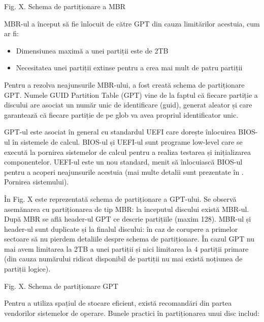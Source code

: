 Fig. X. Schema de partiționare a MBR

MBR-ul a început să fie înlocuit de către GPT din cauza limitărilor acestuia,
cum ar fi:

\begin{itemize}
	\item Dimensiunea maximă a unei partiții este de 2TB
	\item Necesitatea unei partiții extinse pentru a crea mai mult de patru partiții
\end{itemize}

Pentru a rezolva neajunsurile MBR-ului, a fost creată schema de partiționare
GPT. Numele GUID Partition Table (GPT) vine de la faptul că fiecare partiție a
discului are asociat un număr unic de identificare (guid), generat aleator și
care garantează că fiecare partiție de pe glob va avea propriul identificator
unic.

GPT-ul este asociat în general cu standardul UEFI care dorește înlocuirea
BIOS-ul în sistemele de calcul. BIOS-ul și UEFI-ul sunt programe low-level care
se execută la pornirea sistemelor de calcul pentru a realiza testarea și
inițializarea componentelor. UEFI-ul este un nou standard, menit să înlocuiască
BIOS-ul pentru a acoperi neajunsurile acestuia (mai multe detalii sunt
prezentate în . Pornirea sistemului).

În Fig. X este reprezentată schema de partiționare a GPT-ului. Se observă
asemănarea cu partiționarea de tip MBR: la începutul discului există MBR-ul.
După MBR se află header-ul GPT ce descrie partițiile (maxim 128). MBR-ul și
header-ul sunt duplicate și la finalul discului: în caz de corupere a primelor
sectoare să nu pierdem detaliile despre schema de partiționare. În cazul GPT nu
mai avem limitarea la 2TB a unei partiții și nici limitarea la 4 partiții
primare (din cauza numărului ridicat disponibil de partiții nu mai există
noțiunea de partiții logice).

Fig. X. Schema de partiționare GPT

Pentru a utiliza spațiul de stocare eficient, există recomandări din partea
vendorilor sistemelor de operare. Bunele practici în partiționarea unui disc
includ:

